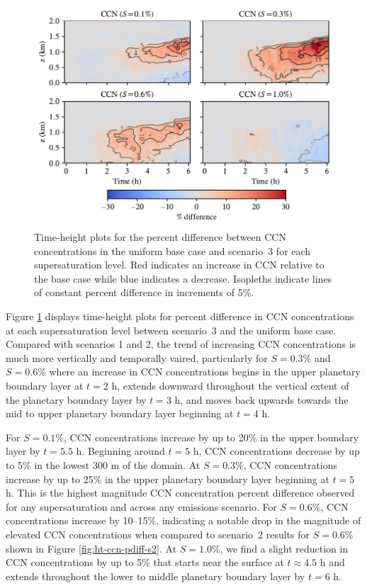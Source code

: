 \begin{figure}[!t]
  \centering
    \includegraphics[width=\textwidth]{figures/chapter5/height-time-ccn-pdiff-point-source-1x1.pdf}
    \caption{Time-height plots for the percent difference between CCN concentrations in the uniform base case and scenario~3 for each supersaturation level. Red indicates an increase in CCN relative to the base case while blue indicates a decrease. Isopleths indicate lines of constant percent difference in increments of 5\%.}
    \label{fig:ht-ccn-pdiff-s3}
\end{figure}

Figure \ref{fig:ht-ccn-pdiff-s3} displays time-height plots for percent difference in CCN concentrations at each supersaturation level between scenario~3 and the uniform base case. 
Compared with scenarios 1 and 2, the trend of increasing CCN concentrations is much more vertically and temporally vaired, particularly for $S=0.3\%$ and $S=0.6\%$ where an increase in CCN concentrations begins in the upper planetary boundary layer at $t=2$ h, extends downward throughout the vertical extent of the planetary boundary layer by $t=3$ h, and moves back upwards towards the mid to upper planetary boundary layer beginning at $t=4$ h. 

For $S=0.1\%$, CCN concentrations increase by up to 20\% in the upper boundary layer by $t=5.5$ h. Beginning around $t=5$ h, CCN concentrations decrease by up to 5\% in the lowest 300 m of the domain. At $S=0.3\%$, CCN concentrations increase by up to 25\% in the upper planetary boundary layer beginning at $t=5$ h. This is the highest magnitude CCN concentration percent difference observed for any supersaturation and across any emissions scenario. For $S=0.6\%$, CCN concentrations increase by 10--15\%, indicating a notable drop in the magnitude of elevated CCN concentrations when compared to scenario~2 results for $S=0.6\%$ shown in Figure \ref{fig:ht-ccn-pdiff-s2}. At $S=1.0\%$, we find a slight reduction in CCN concentrations by up to 5\% that starts near the surface at $t\approx4.5$ h and extends throughout the lower to middle planetary boundary layer by $t=6$ h. 

